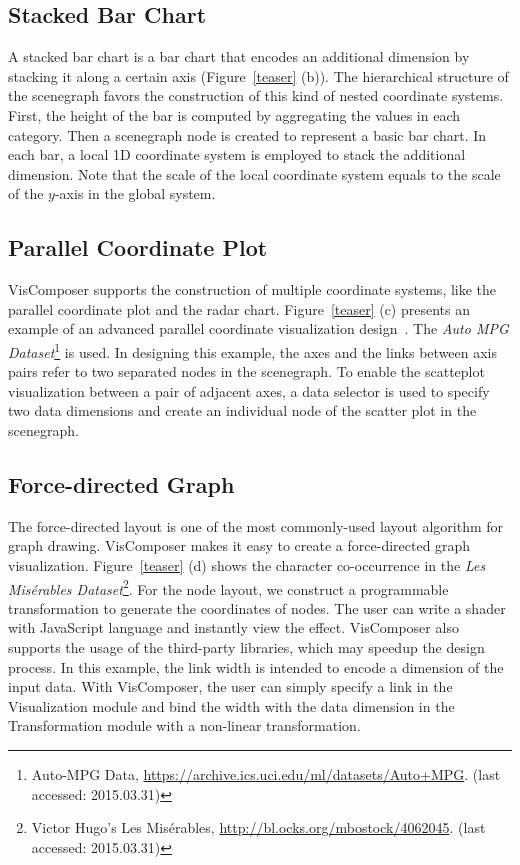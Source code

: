 \subsection{Stacked Bar Chart}
A stacked bar chart is a bar chart that encodes an additional dimension by stacking it along a certain axis (Figure~\ref{teaser} (b)). The hierarchical structure of the scenegraph favors the construction of this kind of nested coordinate systems. First,  the height of the bar is computed by aggregating the values in each category. Then a scenegraph node is created to represent a basic bar chart. In each bar, a local 1D coordinate system is employed to stack the additional dimension. Note that the scale of the local coordinate system equals to the scale of the $y$-axis in the global system.


\subsection{Parallel Coordinate Plot}
VisComposer supports the construction of multiple coordinate systems, like the parallel coordinate plot and the radar chart. Figure~\ref{teaser} (c) presents an example of an advanced parallel coordinate visualization design~\cite{yuan2009scattering}. The \emph{Auto MPG Dataset}\footnote{Auto-MPG Data, \url{https://archive.ics.uci.edu/ml/datasets/Auto+MPG}. (last accessed: 2015.03.31)} is used. In  designing this example, the axes and the links between axis pairs refer to two separated nodes in the scenegraph. To enable the scatteplot visualization between a pair of adjacent axes,  a data selector is used to specify two data dimensions and create an individual node of the scatter plot in the scenegraph.


\subsection{Force-directed Graph}
The force-directed layout is one of the most commonly-used layout algorithm for graph drawing. VisComposer makes it easy to create a force-directed graph visualization. Figure~\ref{teaser} (d) shows the character co-occurrence in the \emph{Les Mis\'{e}rables Dataset}\footnote{Victor Hugo's Les Mis\'{e}rables, \url{http://bl.ocks.org/mbostock/4062045}. (last accessed: 2015.03.31)}. For the node layout, we construct a programmable transformation to generate the coordinates of nodes. The user can write a shader with JavaScript language and instantly view the effect. VisComposer also supports the usage of the third-party libraries, which may speedup the design process. In this example, the link width is intended to encode a dimension of the input data. With VisComposer, the user can simply specify a link in the Visualization module and bind the width with the data dimension in the Transformation module with  a non-linear transformation.

